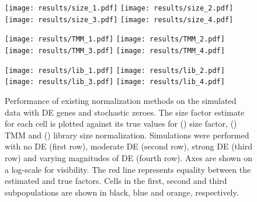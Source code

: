 \documentclass{article}
\begin{document}
\begin{figure}[tbp]
\begin{minipage}{0.33\textwidth}
\texttt{[image: results/size\_1.pdf]}
\texttt{[image: results/size\_2.pdf]}
\texttt{[image: results/size\_3.pdf]}
\texttt{[image: results/size\_4.pdf]}
\subcaption{}\label{subfig:size_sim}
\end{minipage}
\begin{minipage}{0.33\textwidth}
\texttt{[image: results/TMM\_1.pdf]}
\texttt{[image: results/TMM\_2.pdf]}
\texttt{[image: results/TMM\_3.pdf]}
\texttt{[image: results/TMM\_4.pdf]}
\subcaption{}\label{subfig:tmm_sim}
\end{minipage}
\begin{minipage}{0.33\textwidth}
\texttt{[image: results/lib\_1.pdf]}
\texttt{[image: results/lib\_2.pdf]}
\texttt{[image: results/lib\_3.pdf]}
\texttt{[image: results/lib\_4.pdf]}
\subcaption{}\label{subfig:lib_sim}
\end{minipage}
\caption{
    Performance of existing normalization methods on the simulated data with DE genes and stochastic zeroes.
    The size factor estimate for each cell is plotted against its true values for () size factor,
        () TMM and () library size normalization.
    Simulations were performed with no DE (first row), moderate DE (second row), strong DE (third row) and varying magnitudes of DE (fourth row).
    Axes are shown on a log-scale for visibility.
    The red line represents equality between the estimated and true factors.
    Cells in the first, second and third subpopulations are shown in black, blue and orange, respectively.
}
\label{fig:existing_sim}
\end{figure}
\end{document}
